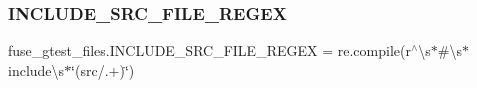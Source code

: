 \subsubsection{\texorpdfstring{INCLUDE\_SRC\_FILE\_REGEX}{INCLUDE\_SRC\_FILE\_REGEX}}
{\footnotesize\ttfamily fuse\+\_\+gtest\+\_\+files.\+I\+N\+C\+L\+U\+D\+E\+\_\+\+S\+R\+C\+\_\+\+F\+I\+L\+E\+\_\+\+R\+E\+G\+EX = re.\+compile(r\textquotesingle{}$^\wedge$\textbackslash{}s$\ast$\#\textbackslash{}s$\ast$include\textbackslash{}s$\ast$\char`\"{}(src/.+)\char`\"{}\textquotesingle{})}

